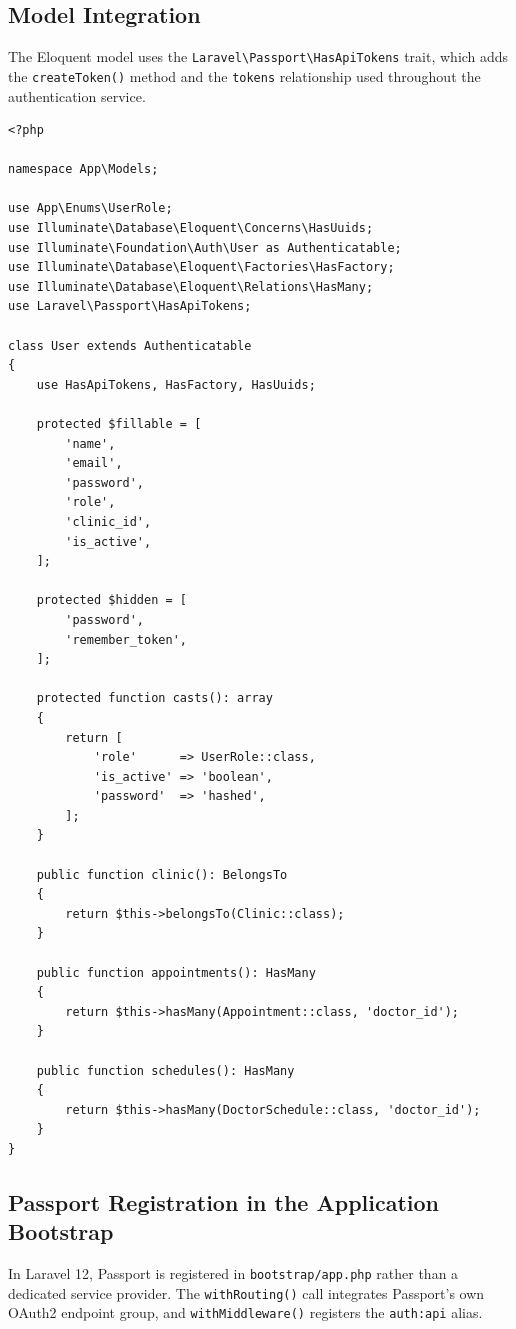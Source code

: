 \subsection{Model Integration}

The  Eloquent model uses the
\texttt{Laravel\textbackslash{}Passport\textbackslash{}HasApiTokens}
trait, which adds the \texttt{createToken()} method and the
\texttt{tokens} relationship used throughout the authentication service.

\begin{lstlisting}[style=php, caption={\texttt{app/Models/User.php} ---
  Passport trait integration and role enum casting.}]
<?php

namespace App\Models;

use App\Enums\UserRole;
use Illuminate\Database\Eloquent\Concerns\HasUuids;
use Illuminate\Foundation\Auth\User as Authenticatable;
use Illuminate\Database\Eloquent\Factories\HasFactory;
use Illuminate\Database\Eloquent\Relations\HasMany;
use Laravel\Passport\HasApiTokens;

class User extends Authenticatable
{
    use HasApiTokens, HasFactory, HasUuids;

    protected $fillable = [
        'name',
        'email',
        'password',
        'role',
        'clinic_id',
        'is_active',
    ];

    protected $hidden = [
        'password',
        'remember_token',
    ];

    protected function casts(): array
    {
        return [
            'role'      => UserRole::class,
            'is_active' => 'boolean',
            'password'  => 'hashed',
        ];
    }

    public function clinic(): BelongsTo
    {
        return $this->belongsTo(Clinic::class);
    }

    public function appointments(): HasMany
    {
        return $this->hasMany(Appointment::class, 'doctor_id');
    }

    public function schedules(): HasMany
    {
        return $this->hasMany(DoctorSchedule::class, 'doctor_id');
    }
}
\end{lstlisting}

\subsection{Passport Registration in the Application Bootstrap}

In Laravel 12, Passport is registered in
\texttt{bootstrap/app.php} rather than a dedicated service provider.
The \texttt{withRouting()} call integrates Passport's own OAuth2
endpoint group, and \texttt{withMiddleware()} registers the
\texttt{auth:api} alias.

